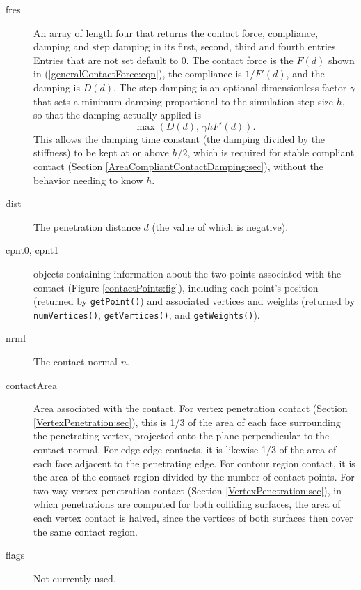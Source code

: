 \begin{description}

\item[fres]\mbox{}

An array of length four that returns the contact force, compliance,
damping and step damping in its first, second, third and fourth
entries. Entries that are not set default to 0. The contact force is
the $F(d)$ shown in (\ref{generalContactForce:eqn}), the compliance
is $1/F'(d)$, and the damping is $D(d)$. The step damping is an
optional dimensionless factor $\gamma$ that sets a minimum damping
proportional to the simulation step size $h$, so that the damping
actually applied is
%
\begin{equation}
\max (D(d), \, \gamma h F'(d)).
\label{stepDamping:eqn}
\end{equation}
%
This allows the damping time constant (the damping divided by the
stiffness) to be kept at or above $h/2$, which is required for stable
compliant contact (Section \ref{AreaCompliantContactDamping:sec}),
without the behavior needing to know $h$.

\item[dist]\mbox{}

The penetration distance $d$ (the value of which is negative).

\item[cpnt0, cpnt1]\mbox{}

 objects
containing information about the two points associated with the
contact (Figure \ref{contactPoints:fig}), including each point's
position (returned by {\tt getPoint()}) and associated vertices and
weights (returned by {\tt numVertices()}, {\tt getVertices()}, and
{\tt getWeights()}).

\item[nrml]\mbox{} 

The contact normal $n$.

\item[contactArea]\mbox{}

Area associated with the contact. For vertex penetration contact
(Section \ref{VertexPenetration:sec}), this is 1/3 of the area of each
face surrounding the penetrating vertex, projected onto the plane
perpendicular to the contact normal. For edge-edge contacts, it is
likewise 1/3 of the area of each face adjacent to the penetrating
edge. For contour region contact, it is the area of the contact region
divided by the number of contact points. For two-way vertex penetration
contact (Section \ref{VertexPenetration:sec}), in which penetrations are
computed for both colliding surfaces, the area of each vertex contact
is halved, since the vertices of both surfaces then cover the same
contact region.

\item[flags]\mbox{}

Not currently used.

\end{description}

